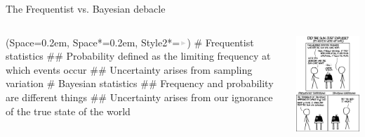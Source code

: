 \documentclass[12pt, aspectratio=149]{beamer}
\newcommand{\listSpace}{0.2em}
\theoremstyle{plain}
\begin{document}
\begin{frame}[fragile]{The Frequentist vs. Bayesian debacle}
		\begin{columns}
		\begin{column}{0.7\linewidth}
				\begin{easylist}
				\ListProperties(Space=\listSpace, Space*=\listSpace, Style2*=$\color{bggraydark}\blacktriangleright$\space)
				# Frequentist statistics
				## Probability defined as the limiting frequency at which events occur
				## Uncertainty arises from sampling variation
				# Bayesian statistics
				## Frequency and probability are different things
				## Uncertainty arises from our ignorance of the true state of the world
			\end{easylist}
		\end{column}
		\begin{column}{0.3\textwidth}
			\includegraphics[height=0.7\textheight]{figs/relevant_xkcd.png}
		\end{column}
	\end{columns}
\end{frame}
\end{document}

